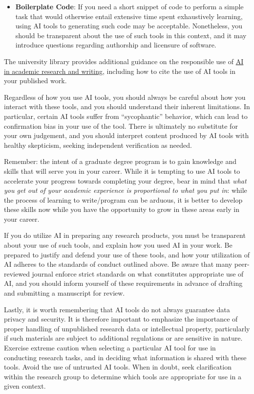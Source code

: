 \documentclass[12pt,a4paper,article,oneside]{memoir} %
\begin{document}
\begin{itemize}
\item \textbf{Boilerplate Code}: If you need a short snippet of code to perform a simple task that would otherwise entail extensive time spent exhaustively learning, using AI tools to generating such code may be acceptable. Nonetheless, you should be transparent about the use of such tools in this context, and it may introduce questions regarding authorship and licensure of software.
\end{itemize}
The university library provides additional guidance on the responsible use of \href{https://info.library.okstate.edu/AI/home}{AI in academic research and writing}, including how to cite the use of AI tools in your published work.

Regardless of how you use AI tools, you should always be careful about how you interact with these tools, and you should understand their inherent limitations. In particular, certain AI tools suffer from ``sycophantic'' behavior, which can lead to confirmation bias in your use of the tool. There is ultimately no substitute for your own judgement, and you should interpret content produced by AI tools with healthy skepticism, seeking independent verification as needed.

Remember: the intent of a graduate degree program is to gain knowledge and skills that will serve you in your career. While it is tempting to use AI tools to accelerate your progress towards completing your degree, bear in mind that \textit{what you get out of your academic experience is proportional to what you put in}: while the process of learning to write/program can be arduous, it is better to develop these skills now while you have the opportunity to grow in these areas early in your career.

If you do utilize AI in preparing any research products, you must be transparent about your use of such tools, and explain how you used AI in your work. Be prepared to justify and defend your use of these tools, and how your utilization of AI adheres to the standards of conduct outlined above. Be aware that many peer-reviewed journal enforce strict standards on what constitutes appropriate use of AI, and you should inform yourself of these requirements in advance of drafting and submitting a manuscript for review.

Lastly, it is worth remembering that AI tools do not always guarantee data privacy and security. It is therefore important to emphasize the importance of proper handling of unpublished research data or intellectual property, particularly if such materials are subject to additional regulations or are sensitive in nature. Exercise extreme caution when selecting a particular AI tool for use in conducting research tasks, and in deciding what information is shared with these tools. Avoid the use of untrusted AI tools. When in doubt, seek clarification within the research group to determine which tools are appropriate for use in a given context.
\end{document}
